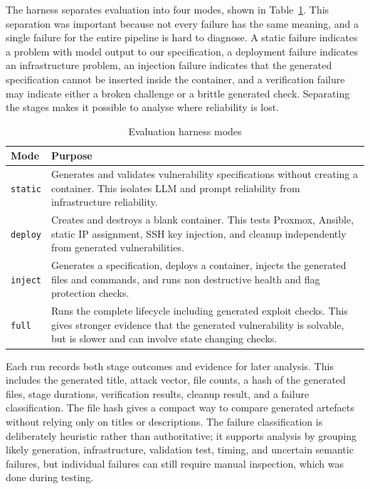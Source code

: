 The harness separates evaluation into four modes, shown in Table~\ref{tab:evaluation-modes}. This separation was important because not every failure has the same meaning, and a single failure for the entire pipeline is hard to diagnose. A static failure indicates a problem with model output to our specification, a deployment failure indicates an infrastructure problem, an injection failure indicates that the generated specification cannot be inserted inside the container, and a verification failure may indicate either a broken challenge or a brittle generated check. Separating the stages makes it possible to analyse where reliability is lost.

\begin{table}[H]
	\centering
	\caption{Evaluation harness modes}
	\label{tab:evaluation-modes}
	\begin{tabular}{|p{2.4cm}|p{10.7cm}|}
		\hline
		\textbf{Mode}      & \textbf{Purpose}                                                                                                                                                                                \\
		\hline
		\lstinline{static}
		                   & Generates and validates vulnerability specifications without creating a container. This isolates LLM and prompt reliability from infrastructure reliability.                                    \\
		\hline
		\lstinline|deploy| & Creates and destroys a blank container. This tests Proxmox, Ansible, static IP assignment, SSH key injection, and cleanup independently from generated vulnerabilities.                         \\
		\hline
		\lstinline|inject| & Generates a specification, deploys a container, injects the generated files and commands, and runs non destructive health and flag protection checks.                                           \\
		\hline
		\lstinline|full|   & Runs the complete lifecycle including generated exploit checks. This gives stronger evidence that the generated vulnerability is solvable, but is slower and can involve state changing checks. \\
		\hline
	\end{tabular}
\end{table}

Each run records both stage outcomes and evidence for later analysis. This includes the generated title, attack vector, file counts, a hash of the generated files, stage durations, verification results, cleanup result, and a failure classification. The file hash gives a compact way to compare generated artefacts without relying only on titles or descriptions. The failure classification is deliberately heuristic rather than authoritative; it supports analysis by grouping likely generation, infrastructure, validation test, timing, and uncertain semantic failures, but individual failures can still require manual inspection, which was done during testing.

